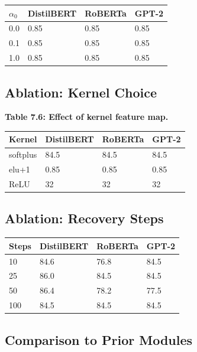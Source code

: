 \begin{table}[H]
\centering
\small
\begin{tabular}{llll}
\toprule
\textbf{$\alpha_0$} & \textbf{DistilBERT} & \textbf{RoBERTa} & \textbf{GPT-2} \\
\midrule
0.0 & 0.85 & 0.85 & 0.85 \\
0.1 & 0.85 & 0.85 & 0.85 \\
1.0 & 0.85 & 0.85 & 0.85 \\
\bottomrule
\end{tabular}
\end{table}

\subsection{Ablation: Kernel Choice}

\textbf{Table 7.6: Effect of kernel feature map.}

\begin{table}[H]
\centering
\small
\begin{tabular}{llll}
\toprule
\textbf{Kernel} & \textbf{DistilBERT} & \textbf{RoBERTa} & \textbf{GPT-2} \\
\midrule
softplus & 84.5 & 84.5 & 84.5 \\
elu+1 & 0.85 & 0.85 & 0.85 \\
ReLU & 32 & 32 & 32 \\
\bottomrule
\end{tabular}
\end{table}

\subsection{Ablation: Recovery Steps}

\begin{table}[H]
\centering
\small
\begin{tabular}{llll}
\toprule
\textbf{Steps} & \textbf{DistilBERT} & \textbf{RoBERTa} & \textbf{GPT-2} \\
\midrule
10 & 84.6 & 76.8 & 84.5 \\
25 & 86.0 & 84.5 & 84.5 \\
50 & 86.4 & 78.2 & 77.5 \\
100 & 84.5 & 84.5 & 84.5 \\
\bottomrule
\end{tabular}
\end{table}

\subsection{Comparison to Prior Modules}

